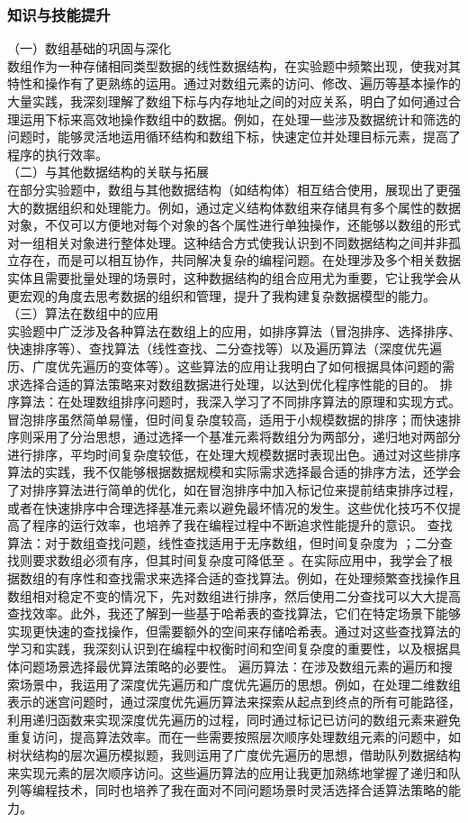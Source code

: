 \documentclass[supercite]{Experimental_Report}
\theoremstyle{definition}
\begin{document}
		\subsubsection{知识与技能提升}
		（一）数组基础的巩固与深化\\
		数组作为一种存储相同类型数据的线性数据结构，在实验题中频繁出现，使我对其特性和操作有了更熟练的运用。通过对数组元素的访问、修改、遍历等基本操作的大量实践，我深刻理解了数组下标与内存地址之间的对应关系，明白了如何通过合理运用下标来高效地操作数组中的数据。例如，在处理一些涉及数据统计和筛选的问题时，能够灵活地运用循环结构和数组下标，快速定位并处理目标元素，提高了程序的执行效率。\\
		（二）与其他数据结构的关联与拓展\\
		在部分实验题中，数组与其他数据结构（如结构体）相互结合使用，展现出了更强大的数据组织和处理能力。例如，通过定义结构体数组来存储具有多个属性的数据对象，不仅可以方便地对每个对象的各个属性进行单独操作，还能够以数组的形式对一组相关对象进行整体处理。这种结合方式使我认识到不同数据结构之间并非孤立存在，而是可以相互协作，共同解决复杂的编程问题。在处理涉及多个相关数据实体且需要批量处理的场景时，这种数据结构的组合应用尤为重要，它让我学会从更宏观的角度去思考数据的组织和管理，提升了我构建复杂数据模型的能力。\\
		（三）算法在数组中的应用\\
		实验题中广泛涉及各种算法在数组上的应用，如排序算法（冒泡排序、选择排序、快速排序等）、查找算法（线性查找、二分查找等）以及遍历算法（深度优先遍历、广度优先遍历的变体等）。这些算法的应用让我明白了如何根据具体问题的需求选择合适的算法策略来对数组数据进行处理，以达到优化程序性能的目的。
		排序算法：在处理数组排序问题时，我深入学习了不同排序算法的原理和实现方式。冒泡排序虽然简单易懂，但时间复杂度较高，适用于小规模数据的排序；而快速排序则采用了分治思想，通过选择一个基准元素将数组分为两部分，递归地对两部分进行排序，平均时间复杂度较低，在处理大规模数据时表现出色。通过对这些排序算法的实践，我不仅能够根据数据规模和实际需求选择最合适的排序方法，还学会了对排序算法进行简单的优化，如在冒泡排序中加入标记位来提前结束排序过程，或者在快速排序中合理选择基准元素以避免最坏情况的发生。这些优化技巧不仅提高了程序的运行效率，也培养了我在编程过程中不断追求性能提升的意识。
		查找算法：对于数组查找问题，线性查找适用于无序数组，但时间复杂度为 ；二分查找则要求数组必须有序，但其时间复杂度可降低至 。在实际应用中，我学会了根据数组的有序性和查找需求来选择合适的查找算法。例如，在处理频繁查找操作且数组相对稳定不变的情况下，先对数组进行排序，然后使用二分查找可以大大提高查找效率。此外，我还了解到一些基于哈希表的查找算法，它们在特定场景下能够实现更快速的查找操作，但需要额外的空间来存储哈希表。通过对这些查找算法的学习和实践，我深刻认识到在编程中权衡时间和空间复杂度的重要性，以及根据具体问题场景选择最优算法策略的必要性。
		遍历算法：在涉及数组元素的遍历和搜索场景中，我运用了深度优先遍历和广度优先遍历的思想。例如，在处理二维数组表示的迷宫问题时，通过深度优先遍历算法来探索从起点到终点的所有可能路径，利用递归函数来实现深度优先遍历的过程，同时通过标记已访问的数组元素来避免重复访问，提高算法效率。而在一些需要按照层次顺序处理数组元素的问题中，如树状结构的层次遍历模拟题，我则运用了广度优先遍历的思想，借助队列数据结构来实现元素的层次顺序访问。这些遍历算法的应用让我更加熟练地掌握了递归和队列等编程技术，同时也培养了我在面对不同问题场景时灵活选择合适算法策略的能力。
\end{document}
